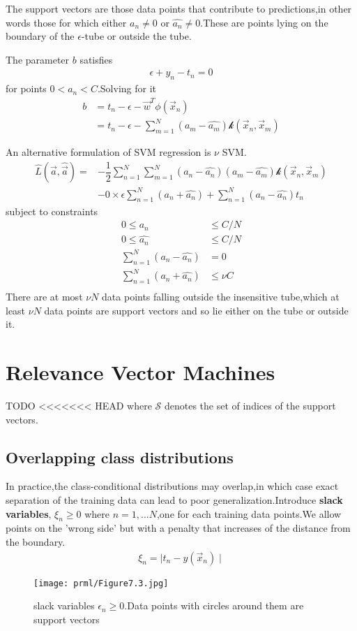 The support vectors are those data points that contribute to predictions,in other words those for which either $a_n \neq 0$ or $\hat{a_n} \neq 0$.These are points lying on the boundary of the $\epsilon$-tube or outside the tube.

The parameter $b$ satisfies 
\begin{align}
\epsilon+y_n-t_n= 0
\end{align}
for points $0<a_n<C$.Solving for it
\begin{align}
b &= t_n-\epsilon-\vec{w}^T\phi(\vec{x}_n) \\
  &= t_n-\epsilon-\sum_{m=1}^{N}(a_m-\hat{a_m})\mathcal{k}(\vec{x}_n,\vec{x}_m)
\end{align}

An alternative formulation of SVM regression is $\nu$ SVM.
\begin{align}
\hat{L}(\vec{a},\hat{\vec{a}}) =&-\dfrac{1}{2}\sum_{n=1}^{N}\sum_{m=1}^{N}(a_n-\hat{a_n})(a_m-\hat{a_m})\mathcal{k}(\vec{x}_n,\vec{x}_m) \\
&-0\times\epsilon\sum_{n=1}^{N}(a_n+\hat{a_n})+\sum_{n=1}^{N}(a_n-\hat{a_n})t_n
\end{align}
subject to constraints
\begin{align}
0\leq a_n &\leq C/N\\
0\leq \hat{a_n} &\leq C/N \\
\sum_{n=1}^{N}(a_n-\hat{a_n}) &=0 \\
\sum_{n=1}^{N}(a_n+\hat{a_n}) &\leq \nu C \\
\end{align}
There are at most $\nu N$ data points falling outside the insensitive tube,which at least $\nu N$ data points are support vectors and so lie either on the tube or outside it.

\section{Relevance Vector Machines}
TODO
<<<<<<< HEAD
where $\mathcal{S}$ denotes the set of indices of the support vectors.

\subsection{Overlapping class distributions}
In practice,the class-conditional distributions may overlap,in which case exact separation of the training data can lead to poor generalization.Introduce \textbf{slack variables}, $\xi_n\geq 0$ where $n=1,...N$,one for each training data points.We allow points on the 'wrong side' but with a penalty that increases of the distance from the boundary.
\begin{align}
\xi_n = \mid t_n-y(\vec{x}_n)\mid
\end{align}
\begin{SCfigure*}
	\caption{slack variables $\epsilon_n\geq 0$.Data points with circles around them are support vectors}
	\texttt{[image: prml/Figure7.3.jpg]}
\end{SCfigure*}

